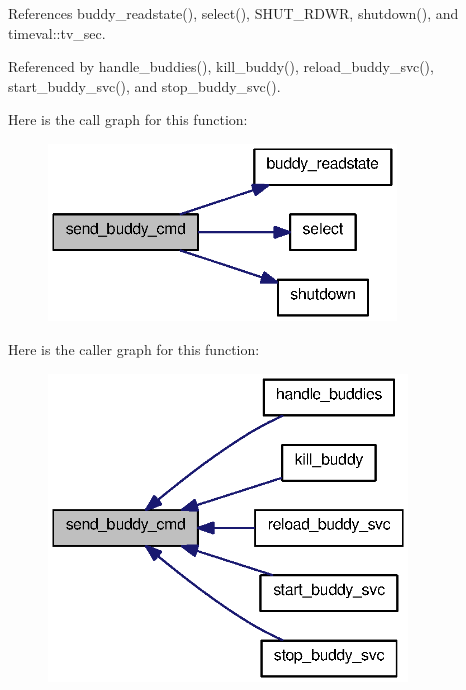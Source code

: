 References buddy\_\-readstate(), select(), SHUT\_\-RDWR, shutdown(), and timeval::tv\_\-sec.



Referenced by handle\_\-buddies(), kill\_\-buddy(), reload\_\-buddy\_\-svc(), start\_\-buddy\_\-svc(), and stop\_\-buddy\_\-svc().



Here is the call graph for this function:
\nopagebreak
\begin{figure}[H]
\begin{center}
\leavevmode
\includegraphics[width=262pt]{ctrl__buddy_8c_a40a47789c2b14952ebdb1c4a78a2b70e_cgraph}
\end{center}
\end{figure}




Here is the caller graph for this function:
\nopagebreak
\begin{figure}[H]
\begin{center}
\leavevmode
\includegraphics[width=270pt]{ctrl__buddy_8c_a40a47789c2b14952ebdb1c4a78a2b70e_icgraph}
\end{center}
\end{figure}


